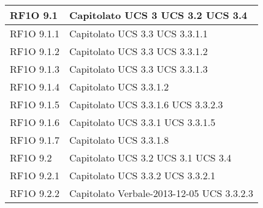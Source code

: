 \begin{center}
\begin{longtable}{ | p{5cm} | p{5cm} |}
        RF1O 9.1 &  Capitolato \newline  UCS 3 \newline  UCS 3.2 \newline  UCS 3.4 \newline  \\ \hline      
        RF1O 9.1.1 &  Capitolato \newline  UCS 3.3 \newline  UCS 3.3.1.1 \newline  \\ \hline      
        RF1O 9.1.2 &  Capitolato \newline  UCS 3.3 \newline  UCS 3.3.1.2 \newline  \\ \hline      
        RF1O 9.1.3 &  Capitolato \newline  UCS 3.3 \newline  UCS 3.3.1.3 \newline  \\ \hline      
        RF1O 9.1.4 &  Capitolato \newline  UCS 3.3.1.2 \newline  \\ \hline      
        RF1O 9.1.5 &  Capitolato \newline  UCS 3.3.1.6 \newline  UCS 3.3.2.3 \newline  \\ \hline      
        RF1O 9.1.6 &  Capitolato \newline  UCS 3.3.1 \newline  UCS 3.3.1.5 \newline  \\ \hline      
        RF1O 9.1.7 &  Capitolato \newline  UCS 3.3.1.8 \newline  \\ \hline      
        RF1O 9.2 &  Capitolato \newline  UCS 3.2 \newline  UCS 3.1 \newline  UCS 3.4 \newline  \\ \hline      
        RF1O 9.2.1 &  Capitolato \newline  UCS 3.3.2 \newline  UCS 3.3.2.1 \newline  \\ \hline      
        RF1O 9.2.2 &  Capitolato \newline  Verbale-2013-12-05 \newline  UCS 3.3.2.3 \newline  \\ \hline      

\end{longtable}
\end{center}
